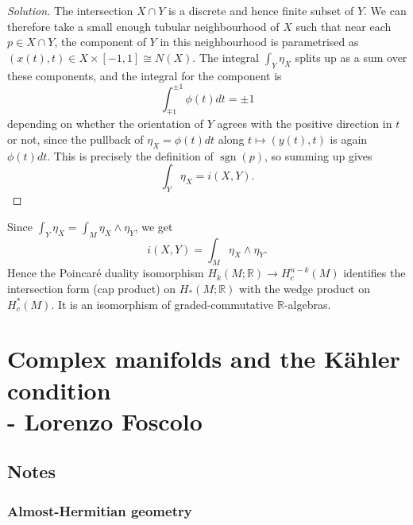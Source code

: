 \documentclass{article}
\theoremstyle{definition}
\DeclareMathOperator{\sgn}{sgn}
\newcommand{\R}{\mathbb{R}}
\begin{document}
\begin{proof}[Solution]
    The intersection $X\cap Y$ is a discrete and hence finite subset of $Y$.
    We can therefore take a small enough tubular neighbourhood of $X$ such that
    near each $p\in X\cap Y$, the component of $Y$ in this neighbourhood is parametrised as
    $(x(t),t)\in X\times[-1,1]\cong N(X)$. The integral $\int_Y\eta_X$ splits
    up as a sum over these components, and the integral for the component is
    \begin{equation*}
        \int_{\mp1}^{\pm1}\phi(t)dt = \pm1
    \end{equation*}
    depending on whether the orientation of $Y$ agrees with the positive
    direction in $t$ or not, since the pullback of $\eta_X=\phi(t)dt$ along
    $t\mapsto(y(t),t)$ is again $\phi(t)dt$. This is precisely the definition
    of $\sgn(p)$, so summing up gives
    \begin{equation*}
        \int_Y\eta_X = i(X,Y).
    \end{equation*}
\end{proof}

Since $\int_Y\eta_X=\int_M\eta_X\wedge\eta_Y$, we get
\begin{equation*}
    i(X,Y) = \int_M\eta_X\wedge\eta_Y.
\end{equation*}
Hence the Poincar\'e duality isomorphism $H_k(M;\R)\to H^{n-k}_c(M)$ identifies
the intersection form (cap product) on $H_*(M;\R)$ with the wedge product on
$H^*_c(M)$. It is an isomorphism of graded-commutative $\R$-algebras.

\newpage

\section{Complex manifolds and the K\"ahler condition \\ - Lorenzo Foscolo}

\subsection*{Notes}

\subsubsection*{Almost-Hermitian geometry}
\end{document}
